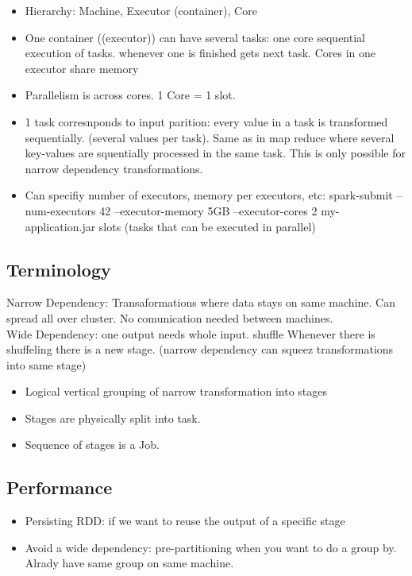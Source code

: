 \begin{itemize}
    \item Hierarchy: Machine, Executor (container), Core
    \item One container ((executor)) can have several tasks:
one core sequential execution of tasks. whenever one is finished gets next task. Cores in one executor share memory
    \item Parallelism is across cores. 1 Core = 1 slot.
    \item 1 task corresnponds to input parition: every value in a task is transformed sequentially.
    (several values per task). Same as in map reduce where several key-values are squentially processed in the same task.
    This is only possible for narrow dependency transformations.
    \item Can specifiy number of executors, memory per executors, etc: spark-submit --num-executors 42 --executor-memory 5GB
    --executor-cores 2 my-application.jar  slots (tasks that can be executed in parallel)
\end{itemize}

\subsection{Terminology}
Narrow Dependency: Transaformations where data stays on same machine. Can spread all over cluster.
No comunication needed between machines. \\
Wide Dependency: one output needs whole input. \textrightarrow shuffle
Whenever there is shuffeling there is a new stage. (narrow dependency can squeez transformations into same stage)\\
\begin{itemize}
    \item Logical vertical grouping of narrow transformation into stages
    \item Stages are physically split into task.
    \item Sequence of stages is a Job.
\end{itemize}

\subsection{Performance}
\begin{itemize}
    \item Persisting RDD: if we want to reuse the output of a specific stage
    \item Avoid a wide dependency: pre-partitioning when you want to do a group by. Alrady have same group on same machine.
\end{itemize}

